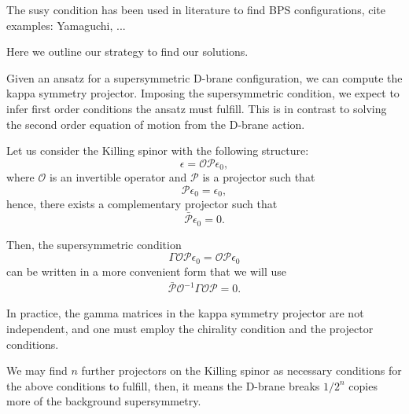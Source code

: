 The susy condition has been used in literature to find BPS configurations, cite examples: Yamaguchi, ...

Here we outline our strategy to find our solutions.

Given an ansatz for a supersymmetric D-brane configuration, we can compute the kappa symmetry projector. 
Imposing the supersymmetric condition, we expect to infer first order conditions the ansatz must fulfill. 
This is in contrast to solving the second order equation of motion from the D-brane action.


Let us consider the Killing spinor with the following structure:
\begin{equation}
\epsilon = \mathcal{O} \mathcal{P} \epsilon_0,
\end{equation}
where $\mathcal{O}$ is an invertible operator and $\mathcal{P}$ is a projector such that
\begin{equation}
    \mathcal{P} \epsilon_0 =  \epsilon_0,
\end{equation}
hence, there exists a complementary projector such that 
\begin{equation}
    \bar{\mathcal{P}} \epsilon_0 =  0.
\end{equation}

Then, the supersymmetric condition
\begin{equation}
 \Gamma \mathcal{O} \mathcal{P} \epsilon_0 = \mathcal{O} \mathcal{P} \epsilon_0
\end{equation}
can be written in a more convenient form that we will use
\begin{align}\label{eq:susyCondition0}
\boxed{\bar{\mathcal{P}} \mathcal{O}^{-1} \Gamma \mathcal{O} \mathcal{P}  = 0}.
\end{align}

In practice, the gamma matrices in the kappa symmetry projector are not independent, and one must employ the chirality condition and the projector conditions. 

We may find $n$ further projectors on the Killing spinor as necessary conditions for the above conditions to fulfill, then, it means the D-brane breaks $1/2^n$ copies more of the background supersymmetry.

























